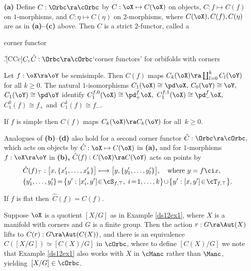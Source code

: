 \documentclass{article}
\begin{document}
\begin{thm}{\bf(a)}
 Define $C:\Orbc\ra\cOrbc$ by $C:\oX\mapsto C(\oX)$
on objects, $C:f\mapsto C(f)$ on\/ $1$-morphisms, and\/ $C:\eta
\mapsto C(\eta)$ on $2$-morphisms, where $C(\oX),C(f),C(\eta)$ are
as in {\bf(a)--(c)} above. Then $C$ is a strict\/ $2$-functor,
called a \begin{bfseries}corner
functor\end{bfseries}.\G[CCc]{$C,\hat C:\Orbc\ra\cOrbc$}{`corner
functors' for orbifolds with corners}
\smallskip

 Let\/ $f:\oX\ra\oY$ be semisimple. Then $C(f)$ maps
$C_k(\oX)\ra\coprod_{l=0}^kC_l(\oY)$ for all\/ $k\ge 0$. The
natural\/ $1$-isomorphisms $C_1(\oX)\cong\pd\oX,$
$C_0(\oY)\cong\oY,$ $C_1(\oY)\cong\pd\oY$ identify
$C_1^{f,0}(\oX)\cong\pd^f_+\oX,$ $C_1^{f,1}(\oX)\cong\pd^f_-\oX,$
$C_1^0(f)\cong f_+$ and\/~$C_1^1(f)\cong f_-$.

If\/ $f$ is simple then
$C(f)$ maps $C_k(\oX)\ra C_k(\oY)$ for all\/~$k\ge 0$.
\smallskip

 Analogues of\/ {\bf(b)}--{\bf(d)} also hold for a
second corner functor\/ $\hat C:\Orbc\ra\cOrbc,$ which acts on
objects by $\hat C:\oX\mapsto C(\oX)$ in {\bf(a)\rm,} and for
$1$-morphisms $f:\oX\ra\oY$ in {\bf(b)\rm,} $\hat C(f):C(\oX)\ra
C(\oY)$ acts on points by
\begin{align*}
&\hat C(f)_\top:\bigl[x,\{x_1',\ldots,x_k'\}\bigr]\longmapsto
\bigl[y,\{y_1',\ldots,y_l'\}\bigr],\quad\text{where $y=f\ci x,$}\\
&\{y_1',\ldots,y_l'\}\!=\!\bigl\{y':[x_i',y']\!\in\!\cS_{f,\top},\;
i\!=\!1,\ldots,k\bigr\}\!\cup\!\bigl\{y':[x,y']\!\in\!
\cT_{f,\top}\bigr\}.
\end{align*}

If\/ $f$ is flat
then\/~$\hat C(f)=C(f)$.
\label{ds12thm2}
\end{thm}

\begin{ex} Suppose $\oX$ is a quotient $[X/G]$ as in Example \ref{ds12ex1}, where
$X$ is a manifold with corners and $G$ is a finite group. Then the
action $r:G\ra\Aut(X)$ lifts to $C(r):G\ra\Aut(C(X))$, and there is
an equivalence $C([X/G])\simeq [C(X)/G]$ in $\cOrbc$, where to
define $[C(X)/G]$ we note that Example \ref{ds12ex1} also works with
$X$ in $\cManc$ rather than $\Manc$, yielding~$[X/G]\in\cOrbc$.
\label{ds12ex2}
\end{ex}
\end{document}
